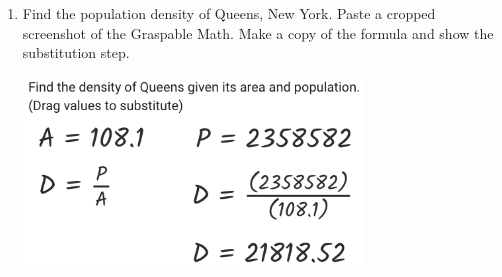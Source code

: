 \begin{enumerate}
\item Find the population density of Queens, New York. Paste a cropped screenshot of the Graspable Math. Make a copy of the formula and show the substitution step.
\vspace{4cm}
\begin{flushright}
  \includegraphics[width=9cm]{../graphics/04solution.png}
\end{flushright}


\end{enumerate}
